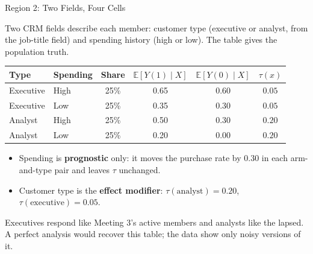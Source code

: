 \documentclass[aspectratio=169, 11pt, handout]{beamer}
\newcommand{\E}{\mathbb{E}}
\begin{document}
\begin{frame}{Region 2: Two Fields, Four Cells}

Two CRM fields describe each member: customer type (executive or analyst, from the job-title field) and spending history (high or low). The table gives the population truth.

\begin{center}
\small
\begin{tabular}{llcccc}
\toprule
\textbf{Type} & \textbf{Spending} & \textbf{Share} & $\E[Y(1) \mid X]$ & $\E[Y(0) \mid X]$ & $\tau(x)$\\
\midrule
Executive & High & 25\% & 0.65 & 0.60 & $0.05$ \\
Executive & Low  & 25\% & 0.35 & 0.30 & $0.05$ \\
Analyst   & High & 25\% & 0.50 & 0.30 & $0.20$ \\
Analyst   & Low  & 25\% & 0.20 & 0.00 & $0.20$ \\
\bottomrule
\end{tabular}
\end{center}

\medskip

\begin{itemize}
  \item Spending is \textbf{prognostic} only: it moves the purchase rate by $0.30$ in each arm-and-type pair and leaves $\tau$ unchanged.
  \item Customer type is the \textbf{effect modifier}: $\tau(\text{analyst}) = 0.20$, $\tau(\text{executive}) = 0.05$.
\end{itemize}

\medskip

Executives respond like Meeting 3's active members and analysts like the lapsed. A perfect analysis would recover this table; the data show only noisy versions of it.
\end{frame}
\end{document}
